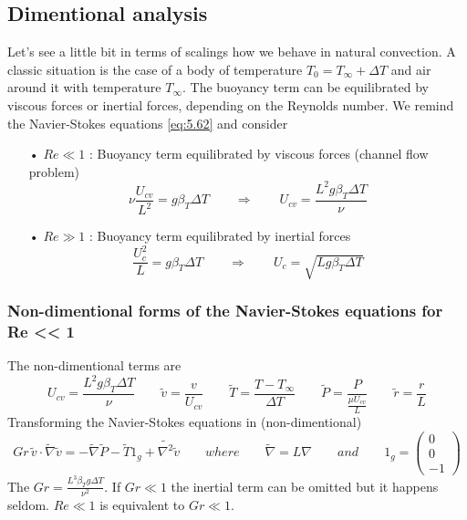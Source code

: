 \subsection{Dimentional analysis}
	Let's see a little bit in terms of scalings how we behave in natural convection. A classic situation is the case of a body of temperature $T_0 = T_\infty + \Delta T$ and air around it with temperature $T_\infty$. The buoyancy term can be equilibrated by viscous forces or inertial forces, depending on the Reynolds number. We remind the Navier-Stokes equations \ref{eq:5.62} and consider \\
	\begin{itemize}
		\item[•] $Re \ll 1$ : Buoyancy term equilibrated by viscous forces (channel flow problem)
		\begin{equation}
			\nu \frac{U_{cv}}{L^2} = g \beta _T \Delta T \qquad \Rightarrow \qquad U_{cv} = \frac{L^2 g \beta _T \Delta T}{\nu}
		\end{equation}
		
		\item[•] $Re \gg 1$ : Buoyancy term equilibrated by inertial forces
		\begin{equation}
			\frac{U^2_{c}}{L} = g\beta _T \Delta T \qquad \Rightarrow \qquad U_c = \sqrt{L g \beta _T \Delta T}
		\end{equation}
	\end{itemize}
	
	\subsubsection{Non-dimentional forms of the Navier-Stokes equations for Re << 1}
	The non-dimentional terms are
	\begin{equation}
		U_{cv} = \frac{L^2 g \beta _T \Delta T}{\nu} \qquad \tilde{v} = \frac{v}{U_{cv}} \qquad \tilde{T} = \frac{T-T_\infty}{\Delta T} \qquad \tilde{P} = \frac{P}{\frac{\mu U_{cv}}{L}} \qquad \tilde{r} = \frac{r}{L}
	\end{equation}
	Transforming the Navier-Stokes equations in (non-dimentional)
	\begin{equation}
		Gr \, \tilde{v} \cdot \tilde{\nabla} \tilde{v} = - \tilde{\nabla} \tilde{P} - \tilde{T} 1_g + \tilde{\nabla ^2} \tilde{v} \qquad where \qquad \tilde{\nabla} = L\nabla \qquad and \qquad 1_g = \left( 
		\begin{array}{c}
		0 \\ 
		0 \\ 
		-1
		\end{array} 
		\right)
	\end{equation}
	The $Gr = \frac{L^3 \beta _T g \Delta T}{\nu ^2}$. If $Gr \ll 1$ the inertial term can be omitted but it happens seldom. $Re \ll 1$ is equivalent to $Gr \ll 1$. 
	
